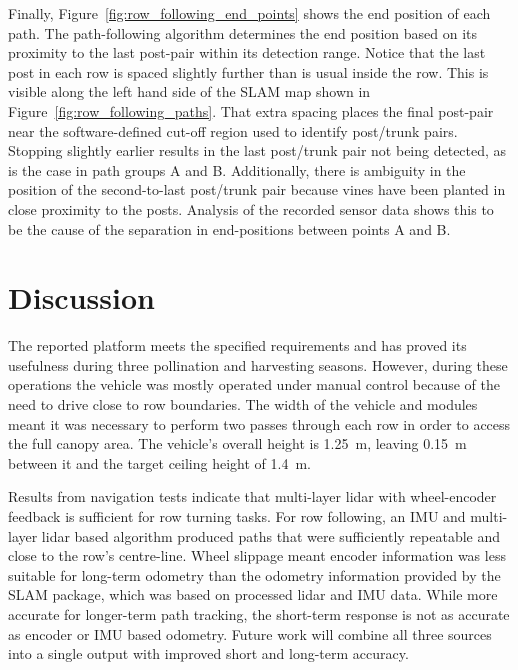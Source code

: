\documentclass[preprint,authoryear,12pt]{elsarticle}
\begin{document}
    Finally, Figure~\ref{fig:row_following_end_points} shows the end position of each path.
    The path-following algorithm determines the end position based on its proximity to the last post-pair within its detection range.
    Notice that the last post in each row is spaced slightly further than is usual inside the row.
    This is visible along the left hand side of the SLAM map shown in Figure~\ref{fig:row_following_paths}.
    That extra spacing places the final post-pair near the software-defined cut-off region used to identify post/trunk pairs.
    Stopping slightly earlier results in the last post/trunk pair not being detected, as is the case in path groups A and B.
    Additionally, there is ambiguity in the position of the second-to-last post/trunk pair because vines have been planted in close proximity to the posts.
    Analysis of the recorded sensor data shows this to be the cause of the separation in end-positions between points A and B.

\section{Discussion}
\label{sect:discussion}

    The reported platform meets the specified requirements and has proved its usefulness during three pollination and harvesting seasons.
    However, during these operations the vehicle was mostly operated under manual control because of the need to drive close to row boundaries.
    The width of the vehicle and modules meant it was necessary to perform two passes through each row in order to access the full canopy area.
    The vehicle's overall height is \SI{1.25}{\meter}, leaving \SI{0.15}{\meter} between it and the target ceiling height of \SI{1.4}{\meter}.

    Results from navigation tests indicate that multi-layer lidar with wheel-encoder feedback is sufficient for row turning tasks.
    For row following, an IMU and multi-layer lidar based algorithm produced paths that were sufficiently repeatable and close to the row's centre-line.
    Wheel slippage meant encoder information was less suitable for long-term odometry than the odometry information provided by the SLAM package, which was based on processed lidar and IMU data.
    While more accurate for longer-term path tracking, the short-term response is not as accurate as encoder or IMU based odometry.
    Future work will combine all three sources into a single output with improved short and long-term accuracy.
\end{document}
